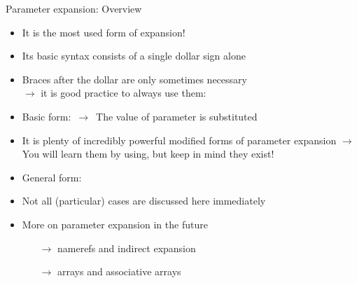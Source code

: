 \begin{frame}{Parameter expansion: Overview}
    \vspace{-3mm}
    \begin{itemize}
        \item It is the most used form of expansion!
        \item Its basic syntax consists of a single dollar sign alone
        \item Braces after the dollar are only sometimes necessary\\
              $\to$ it is good practice to always use them: \PP{\texttt{\$\{\ldots\}}}
        \item Basic form:  $\,\to\,$ The value of parameter is substituted
        \item It is plenty of incredibly powerful modified forms of parameter expansion
              $\to$ You will learn them by using, but \alert{keep in mind they exist}!
        \item General form: 
        \item Not all (particular) cases are discussed here immediately
        \item More on parameter expansion in the future\\
              \begin{itemize}
                  \item[$\to$] namerefs and indirect expansion
                  \item[$\to$] arrays and associative arrays
              \end{itemize}
    \end{itemize}
\end{frame}
